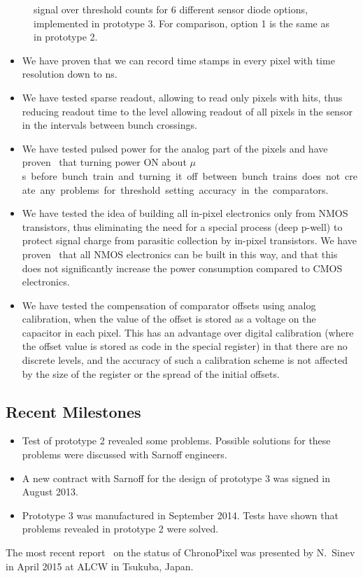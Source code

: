 \begin{figure}
\begin{minipage}[t]{0.49\textwidth}
    \caption{ signal over threshold counts for 6 different sensor diode options,
implemented in prototype 3. For comparison, option 1 is the same as in prototype 2.}
    \label{fig:VertexDetector:ChronoPixel:Fe55Response}
\end{minipage}
\end{figure}
\begin{itemize}
    \item We have proven that we can record time stamps in every pixel with time resolution down to \unit[150]{ns}.
    \item We have tested sparse readout, allowing to read only pixels with hits, thus reducing readout time to the level allowing readout of all pixels in the sensor in the intervals between bunch crossings.
    \item We have tested pulsed power for the analog part of the pixels and have proven~\cite{sinev:Chronopix:FirstPrototype} that turning power ON about \unit[100]{$\mu$s} before bunch train and turning it off between bunch trains does not create any problems for threshold setting accuracy in the comparators.
    \item We have tested the idea of building all in-pixel electronics only from NMOS transistors, thus eliminating the need for a special process (deep p-well) to protect signal charge from parasitic collection by in-pixel transistors. We have proven~\cite{sinev:Chronopixel:RnDstatus2013} that all NMOS electronics can be built in this way, and that this does not significantly increase the power consumption compared to CMOS electronics.
    \item We have tested the compensation of comparator offsets using analog calibration, when the value of the offset is stored as a voltage on the capacitor in each pixel. This has an advantage over digital calibration (where the offset value is stored as code in the special register) in that there are no discrete levels, and the accuracy of such a calibration scheme is not affected by the size of the register or the spread of the initial offsets.
\end{itemize}
\subsection{Recent Milestones}
\begin{itemize}
    \item Test of prototype 2 revealed some problems. Possible solutions for these problems were discussed with Sarnoff engineers.
    \item A new contract with Sarnoff for the design of prototype 3 was signed in August 2013.
    \item Prototype 3 was manufactured in September 2014. Tests have shown that problems revealed in prototype 2 were solved.
\end{itemize}
The most recent report~\cite{sinev:Chronopixel:status2014} on the status of ChronoPixel was presented by N.~Sinev in April 2015 at ALCW in Tsukuba, Japan.

